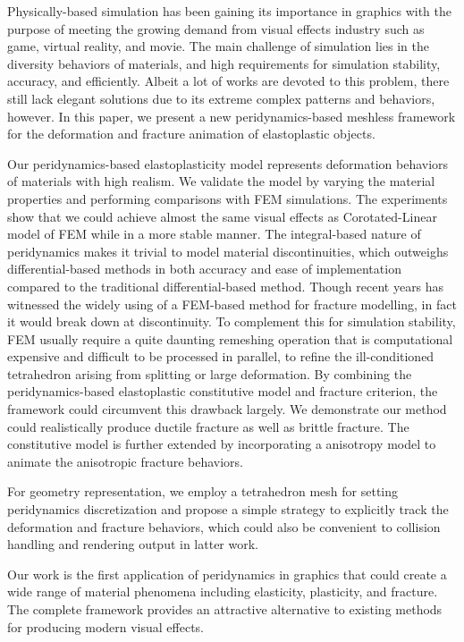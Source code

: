 \begin{eabstract}
Physically-based simulation has been gaining its importance in graphics with the purpose of meeting the growing demand from visual effects industry such as game, virtual reality, and movie.
The main challenge of simulation lies in the diversity behaviors of materials, and high requirements for simulation stability, accuracy, and efficiently.
Albeit a lot of works are devoted to this problem, there still lack elegant solutions due to its extreme complex patterns and behaviors, however.
In this paper, we present a new peridynamics-based meshless framework for the deformation and fracture animation of elastoplastic objects.

Our peridynamics-based elastoplasticity model represents deformation behaviors of materials with high realism.
We validate the model by varying the material properties and performing comparisons with FEM simulations.
The experiments show that we could achieve almost the same visual effects as Corotated-Linear model of FEM while in a more stable manner.
The integral-based nature of peridynamics makes it trivial to model material discontinuities, which outweighs differential-based methods in both accuracy and ease of implementation compared to the traditional differential-based method.
Though recent years has witnessed the widely using of a FEM-based method for fracture modelling, in fact it would break down at discontinuity.
To complement this for simulation stability, FEM usually require a quite daunting remeshing operation that is computational expensive and difficult to be processed in parallel,
to refine the ill-conditioned tetrahedron arising from splitting or large deformation.
By combining the peridynamics-based elastoplastic constitutive model and fracture criterion, the framework could circumvent this drawback largely.
We demonstrate our method could realistically produce ductile fracture as well as brittle fracture.
The constitutive model is further extended by incorporating  a anisotropy model to animate the anisotropic fracture behaviors.

For geometry representation, we employ a tetrahedron mesh for setting peridynamics discretization and propose a simple strategy to explicitly track the deformation and fracture behaviors,
which could also be convenient to collision handling and rendering output in latter work.

Our work is the first application of peridynamics in graphics that could create a wide range of material phenomena including elasticity, plasticity, and fracture.
The complete framework provides an attractive alternative to existing methods for producing modern visual effects.



\end{eabstract}

